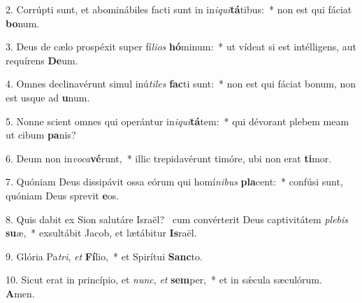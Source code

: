 2. Corrúpti sunt, et abominábiles facti sunt in in\textit{i}\textit{qui}\textbf{tá}tibus:~*  non est qui fáciat \textbf{bo}num.\

3. Deus de cælo prospéxit super fí\textit{li}\textit{os} \textbf{hó}minum:~*  ut vídeat si est intélligens, aut requírens \textbf{De}um.\

4. Omnes declinavérunt simul inú\textit{ti}\textit{les} \textbf{fac}ti sunt:~*  non est qui fáciat bonum, non est usque ad \textbf{u}num.\

5. Nonne scient omnes qui operántur in\textit{i}\textit{qui}\textbf{tá}tem:~*  qui dévorant plebem meam ut cibum \textbf{pa}nis?\

6. Deum non in\textit{vo}\textit{ca}\textbf{vé}runt,~*  illic trepidavérunt timóre, ubi non erat \textbf{ti}mor.\

7. Quóniam Deus dissipávit ossa eórum qui homí\textit{ni}\textit{bus} \textbf{pla}cent:~*  confúsi sunt, quóniam Deus sprevit \textbf{e}os.\

8. Quis dabit ex Sion salutáre Israël? \dag\  cum convérterit Deus captivitátem \textit{ple}\textit{bis} \textbf{su}æ,~*  exsultábit Jacob, et lætábitur \textbf{Is}raël.\

9. Glória Pa\textit{tri}, \textit{et} \textbf{Fí}lio,~*  et Spirítui \textbf{Sanc}to.\

10. Sicut erat in princípio, et \textit{nunc}, \textit{et} \textbf{sem}per,~*  et in sǽcula sæculórum. \textbf{A}men.\

